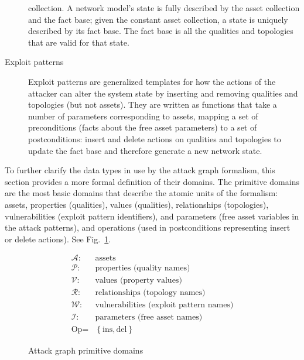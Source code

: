 \begin{description}
		collection. A network model's state is fully described by the asset collection and the fact base;
		given the constant asset collection, a state is uniquely described by its fact base. The fact
		base is all the qualities and topologies that are valid for that state.
	\item[Exploit patterns] Exploit patterns are generalized templates for how the actions of the attacker
		can alter the system state by inserting and removing qualities and topologies (but not assets).
		They are written as functions that take a number of parameters corresponding to assets, mapping
		a set of preconditions (facts about the free asset parameters) to a set of postconditions:
		insert and delete actions on qualities and topologies to update the fact base and therefore
		generate a new network state.
\end{description}
\label{sec:domains}
To further clarify the data types in use by the attack graph formalism,
this section provides a more formal definition of their domains.
The primitive domains are the most basic 
domains that describe the atomic units of
the formalism: assets, properties (qualities), values (qualities), relationships (topologies),
vulnerabilities (exploit pattern identifiers), and parameters (free asset variables in the attack
patterns), and operations (used in postconditions representing insert or delete actions).
See Fig.~\ref{fig:primitivedomains}.

\begin{figure}
\begin{align*}
    \mathcal{A} :& \text{assets} \\
    \mathcal{P} :& \text{properties (quality names)} \\
    \mathcal{V} :& \text{values (property values)} \\
    \mathcal{R} :& \text{relationships (topology names)} \\
    \mathcal{W} :& \text{vulnerabilities (exploit pattern names)} \\
    \mathcal{I} :& \text{parameters (free asset names)} \\
    \text{Op} =& \left\{\text{ins}, \text{del} \right\}
\end{align*}
\caption{Attack graph primitive domains}
\label{fig:primitivedomains}
\end{figure}

